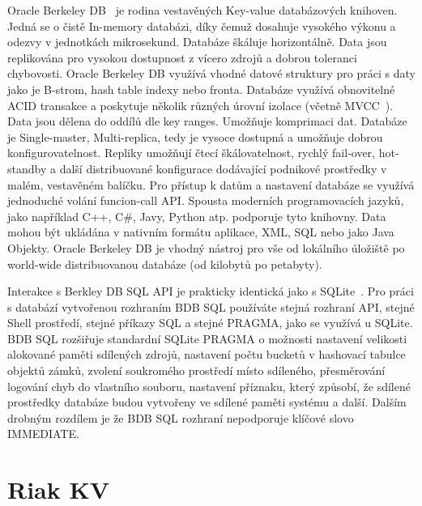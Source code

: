 \documentclass[czech,master,dept460,male,csharp,cpdeclaration]{diploma}
\begin{document}
	Oracle Berkeley DB~\cite{berkeleydb} je rodina vestavěných Key-value databázových knihoven. Jedná se o čistě In-memory databázi, díky čemuž dosahuje vysokého výkonu a odezvy v jednotkách mikrosekund. Databáze škáluje horizontálně. Data jsou replikována pro vysokou dostupnost z vícero zdrojů a dobrou toleranci chybovosti. Oracle Berkeley DB využívá vhodné datové struktury pro práci s daty jako je B-strom, hash table indexy nebo fronta. Databáze využívá obnovitelné ACID transakce a poskytuje několik různých úrovní izolace (včetně MVCC~\cite{mvcc}). Data jsou dělena do oddílů dle key ranges. Umožňuje komprimaci dat. Databáze je Single-master, Multi-replica, tedy je vysoce dostupná a umožňuje dobrou konfigurovatelnost. Repliky umožňují čtecí škálovatelnost, rychlý fail-over, hot-standby a další distribuované konfigurace dodávající podnikové prostředky v malém, vestavěném balíčku. Pro přístup k datům a nastavení databáze se využívá jednoduché volání funcion-call API. Spousta moderních programovacích jazyků, jako například C++, C\#, Javy, Python atp. podporuje tyto knihovny. Data mohou být ukládána v nativním formátu aplikace, XML, SQL nebo jako Java Objekty. Oracle Berkeley DB je vhodný nástroj pro vše od lokálního úložiště po world-wide distribuovanou databáze (od kilobytů po petabyty).
	
	Interakce s Berkley DB SQL API je prakticky identická jako s SQLite~\cite{sqlite}. Pro práci s databází vytvořenou rozhraním BDB SQL používáte stejná rozhraní API, stejné Shell prostředí, stejné příkazy SQL a stejné PRAGMA, jako se využívá u SQLite. BDB SQL rozšiřuje standardní SQLite PRAGMA o možnosti nastavení velikosti alokované paměti sdílených zdrojů, nastavení počtu bucketů v hashovací tabulce objektů zámků, zvolení soukromého prostředí místo sdíleného, přesměrování logování chyb do vlastního souboru, nastavení příznaku, který způsobí, že sdílené prostředky databáze budou vytvořeny ve sdílené paměti systému a další. Dalším drobným rozdílem je že BDB SQL rozhraní nepodporuje klíčové slovo IMMEDIATE.
	
	\section{Riak KV} \label{lab-riak}
	
\end{document}
